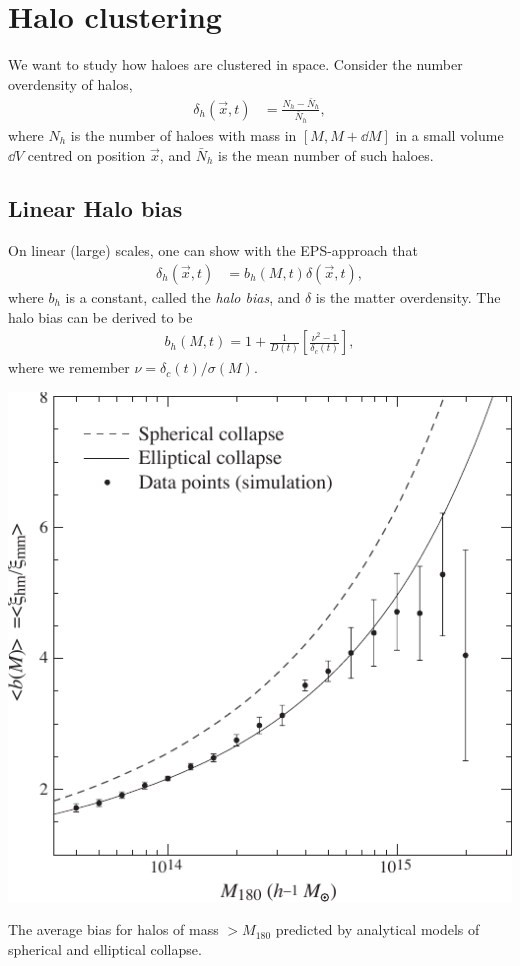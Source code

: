 \section{Halo clustering}


We want to study how haloes are clustered in space.
Consider the number overdensity of halos,
\begin{align*}
	\delta_h(\vec{x}, t)
	&= \frac{N_h - \bar{N}_h}{\bar{N}_h},
\end{align*}
where $N_h$ is the number of haloes with mass in $[M, M + \dd{M}]$ in a small volume $\dd{V}$ centred on position $\vec{x}$, 
and $\bar{N}_h$ is the mean number of such haloes.

\subsection{Linear Halo bias}
On linear (large) scales, one can show with the EPS-approach that
\begin{align*}
	\delta_h(\vec{x}, t)
	&= b_h(M, t) \delta(\vec{x}, t),
\end{align*}
where $b_h$ is a constant, called the \emph{halo bias},
and $\delta$ is the matter overdensity.
The halo bias can be derived to be
\begin{align*}
	b_h(M, t)
	= 1 + \frac{1}{D(t)}
	\left[ \frac{\nu^2 -1}{\delta_c(t)} \right],
\end{align*}
where we remember $\nu = \delta_c(t) / \sigma(M)$.

\begin{marginfigure}
	\includegraphics[width=\textwidth]{img/ch-04/halo-bias.pdf}
	\caption{The average bias for halos of mass $> M_{180}$ predicted by analytical models of spherical and elliptical collapse.}
	\label{fig:halo-bias}
\end{marginfigure}

